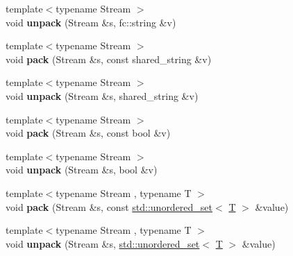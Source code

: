 \begin{DoxyCompactItemize}
\item 
\mbox{\label{namespacefc_1_1raw_acd21e607b08af2b09c2c28299ecd8c79}} 
{\footnotesize template$<$typename Stream $>$ }\\void {\bfseries unpack} (Stream \&s, fc\+::string \&v)
\item 
\mbox{\label{namespacefc_1_1raw_a59b47242106d06aeca25e1f3e281e36b}} 
{\footnotesize template$<$typename Stream $>$ }\\void {\bfseries pack} (Stream \&s, const shared\+\_\+string \&v)
\item 
\mbox{\label{namespacefc_1_1raw_acb0f49b055f3e09913847a4447a808f8}} 
{\footnotesize template$<$typename Stream $>$ }\\void {\bfseries unpack} (Stream \&s, shared\+\_\+string \&v)
\item 
\mbox{\label{namespacefc_1_1raw_a07044dd3d3b6fa1bf4439bf09dd99c42}} 
{\footnotesize template$<$typename Stream $>$ }\\void {\bfseries pack} (Stream \&s, const bool \&v)
\item 
\mbox{\label{namespacefc_1_1raw_aa32b83c3bfc40bf1cc741b69c96fab50}} 
{\footnotesize template$<$typename Stream $>$ }\\void {\bfseries unpack} (Stream \&s, bool \&v)
\item 
\mbox{\label{namespacefc_1_1raw_a719169120fd05a6546824739fa5e4342}} 
{\footnotesize template$<$typename Stream , typename T $>$ }\\void {\bfseries pack} (Stream \&s, const \mbox{\hyperlink{classstd_1_1unordered__set}{std\+::unordered\+\_\+set}}$<$ \mbox{\hyperlink{struct_t}{T}} $>$ \&value)
\item 
\mbox{\label{namespacefc_1_1raw_aa10d1d1815362915e15825191573696d}} 
{\footnotesize template$<$typename Stream , typename T $>$ }\\void {\bfseries unpack} (Stream \&s, \mbox{\hyperlink{classstd_1_1unordered__set}{std\+::unordered\+\_\+set}}$<$ \mbox{\hyperlink{struct_t}{T}} $>$ \&value)
\item 
\mbox{\label{namespacefc_1_1raw_a6bfa8d4867ded739fee81194b5dd8389}} 

\end{DoxyCompactItemize}
